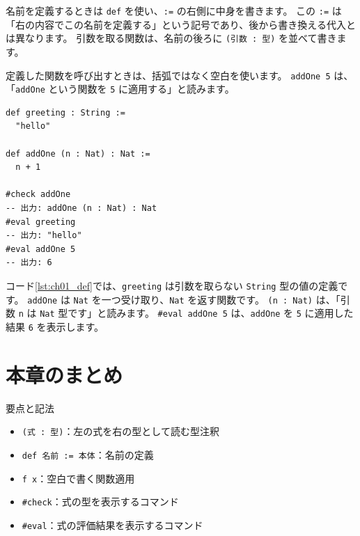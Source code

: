 名前を定義するときは \texttt{def} を使い、\texttt{:=} の右側に中身を書きます。
この \texttt{:=} は「右の内容でこの名前を定義する」という記号であり、後から書き換える代入とは異なります。
引数を取る関数は、名前の後ろに \texttt{(引数 : 型)} を並べて書きます。

定義した関数を呼び出すときは、括弧ではなく空白を使います。
\texttt{addOne 5} は、「\texttt{addOne} という関数を \texttt{5} に適用する」と読みます。

\begin{listing}[htbp]
\begin{verbatim}
def greeting : String :=
  "hello"

def addOne (n : Nat) : Nat :=
  n + 1

#check addOne
-- 出力: addOne (n : Nat) : Nat
#eval greeting
-- 出力: "hello"
#eval addOne 5
-- 出力: 6
\end{verbatim}
\caption{\texttt{greeting} と \texttt{addOne}}
\label{lst:ch01_def}
\end{listing}

コード\ref{lst:ch01_def}では、\texttt{greeting} は引数を取らない \texttt{String} 型の値の定義です。
\texttt{addOne} は \texttt{Nat} を一つ受け取り、\texttt{Nat} を返す関数です。
\texttt{(n : Nat)} は、「引数 \texttt{n} は \texttt{Nat} 型です」と読みます。
\texttt{\#eval addOne 5} は、\texttt{addOne} を \texttt{5} に適用した結果 \texttt{6} を表示します。

\section{本章のまとめ}

要点と記法
\begin{itemize}
\item \texttt{(式 : 型)}：左の式を右の型として読む型注釈
\item \texttt{def 名前 := 本体}：名前の定義
\item \texttt{f x}：空白で書く関数適用
\item \texttt{\#check}：式の型を表示するコマンド
\item \texttt{\#eval}：式の評価結果を表示するコマンド
\end{itemize}
